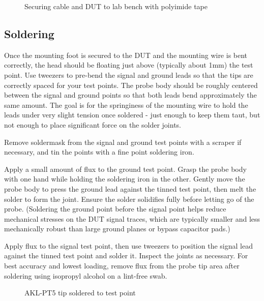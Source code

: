 \documentclass[11pt]{article}
\begin{document}
\begin{figure}[h]
\centering
\caption{Securing cable and DUT to lab bench with polyimide tape}
\label{cable-secured}
\end{figure}

\FloatBarrier

\subsection{Soldering}

Once the mounting foot is secured to the DUT and the mounting wire is bent correctly, the head should be floating just
above (typically about 1mm) the test point. Use tweezers to pre-bend the signal and ground leads so that the tips are
correctly spaced for your test points. The probe body should be roughly centered between the signal and ground points
so that both leads bend approximately the same amount. The goal is for the springiness of the mounting wire to hold the
leads under very slight tension once soldered - just enough to keep them taut, but not enough to place significant
force on the solder joints.

Remove soldermask from the signal and ground test points with a scraper if necessary, and tin the points with a fine
point soldering iron.

Apply a small amount of flux to the ground test point. Grasp the probe body with one hand while holding the soldering
iron in the other. Gently move the probe body to press the ground lead against the tinned test point, then melt the
solder to form the joint. Ensure the solder solidifies fully before letting go of the probe. (Soldering the ground
point before the signal point helps reduce mechanical stresses on the DUT signal traces, which are typically smaller
and less mechanically robust than large ground planes or bypass capacitor pads.)

Apply flux to the signal test point, then use tweezers to position the signal lead against the tinned test point and
solder it. Inspect the joints as necessary. For best accuracy and lowest loading, remove flux from the probe tip area
after soldering using isopropyl alcohol on a lint-free swab.

\begin{figure}[h]
\centering
\caption{AKL-PT5 tip soldered to test point}
\label{tip-on-testpoint}
\end{figure}
\FloatBarrier
\end{document}
